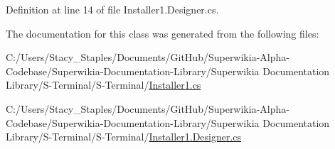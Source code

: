 Definition at line 14 of file Installer1.\+Designer.\+cs.



The documentation for this class was generated from the following files\+:\begin{DoxyCompactItemize}
\item 
C\+:/\+Users/\+Stacy\+\_\+\+Staples/\+Documents/\+Git\+Hub/\+Superwikia-\/\+Alpha-\/\+Codebase/\+Superwikia-\/\+Documentation-\/\+Library/\+Superwikia Documentation Library/\+S-\/\+Terminal/\+S-\/\+Terminal/\hyperlink{_installer1_8cs}{Installer1.\+cs}\item 
C\+:/\+Users/\+Stacy\+\_\+\+Staples/\+Documents/\+Git\+Hub/\+Superwikia-\/\+Alpha-\/\+Codebase/\+Superwikia-\/\+Documentation-\/\+Library/\+Superwikia Documentation Library/\+S-\/\+Terminal/\+S-\/\+Terminal/\hyperlink{_installer1_8_designer_8cs}{Installer1.\+Designer.\+cs}\end{DoxyCompactItemize}
